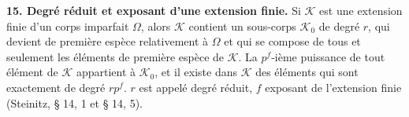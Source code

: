 \textbf{15. Degré réduit et exposant d'une extension finie.} Si $\mathcal K$ est une extension finie d'un corps imparfait $\Omega$, alors $\mathcal K$ contient un sous-corps $\mathcal K_0$ de degré $r$, qui devient de première espèce relativement à $\Omega$ et qui se compose de tous et seulement les éléments de première espèce de $\mathcal K$. La $p^f$-ième puissance de tout élément de $\mathcal K$ appartient à $\mathcal K_0$, et il existe dans $\mathcal K$ des éléments qui sont exactement de degré $rp^f$. $r$ est appelé degré réduit, $f$ exposant de l'extension finie (Steinitz, \S{} 14, 1 et \S{} 14, 5).
